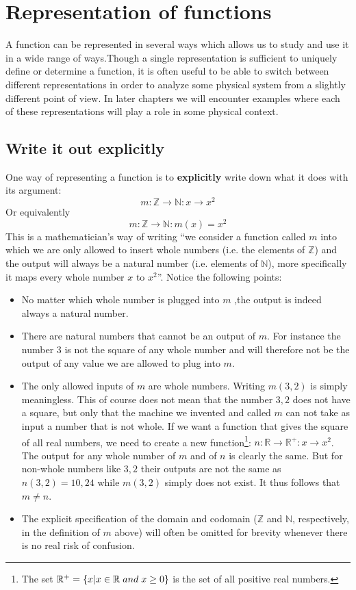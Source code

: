 \section{Representation of functions}

A function can be represented in several ways which allows us to study and use it in a wide range of ways.Though a single representation is sufficient to uniquely define or determine a function, it is often useful to be able to switch between different representations in order to analyze some physical system from a slightly different point of view. In later chapters we will encounter examples where each of these representations will play a role in some physical context.

\subsection{Write it out explicitly}
\label{Expl_Func}
\noindent One way of representing a function is to \textbf{explicitly} write down what it does with its argument:
$$
m:\mathbb{Z} \rightarrow \mathbb{N}: x \rightarrow x^2
$$
Or equivalently
$$
m:\mathbb{Z} \rightarrow \mathbb{N}: m(x) = x^2
$$
This is a mathematician's way of writing "`we consider a function called $m$ into which we are only allowed to insert whole numbers (i.e. the elements of $\mathbb{Z}$) and the output will always be a natural number (i.e. elements of $\mathbb{N}$), more specifically it maps every whole number $x$ to $x^2$"'. Notice the following points:
\begin{itemize}
\item No matter which whole number is plugged into $m$ ,the output is indeed always a natural number.
\item There are natural numbers that cannot be an output of $m$. For instance the number $3$ is not the square of any whole number and will therefore not be the output of any value we are allowed to plug into $m$.
\item The only allowed inputs of $m$ are whole numbers. Writing $m(3,2)$ is simply meaningless. This of course does not mean that the number $3,2$ does not have a square, but only that the machine we invented and called $m$ can not take as input a number that is not whole. If we want a function that gives the square of all real numbers, we need to create a new function\footnote{The set $\mathbb{R}^+ = \left\{ x | x \in \mathbb{R} \textit \; {and} \;  x \geq 0 \right\}$ is the set of all positive real numbers.}: $n : \mathbb{R} \rightarrow \mathbb{R}^+ : x \rightarrow x^2$. The output for any whole number of $m$ and of $n$ is clearly the same. But for non-whole numbers like $3,2$ their outputs are not the same as $n(3,2) = 10,24$ while $m(3,2)$ simply does not exist. It thus follows that $m \neq n$.
\item The explicit specification of the domain and codomain ($\mathbb{Z}$ and $\mathbb{N}$, respectively, in the definition of $m$ above) will often be omitted for brevity whenever there is no real risk of confusion.\\
\end{itemize}
